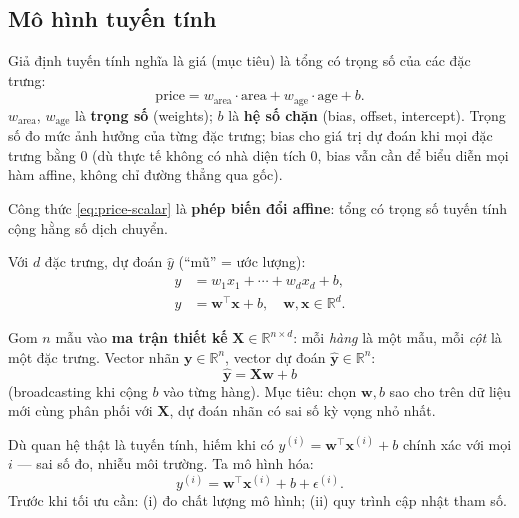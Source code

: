 \documentclass[12pt,a4paper]{article}
\begin{document}
\subsection{Mô hình tuyến tính}

\begin{dinhnghia}[title={Mô hình affine / tuyến tính}]
Giả định tuyến tính nghĩa là giá (mục tiêu) là tổng có trọng số của các đặc trưng:
\begin{equation}\label{eq:price-scalar}
  \mathrm{price} = w_{\mathrm{area}} \cdot \mathrm{area} + w_{\mathrm{age}} \cdot \mathrm{age} + b.
\end{equation}
$w_{\mathrm{area}}$, $w_{\mathrm{age}}$ là \textbf{trọng số} (weights); $b$ là \textbf{hệ số chặn} (bias, offset, intercept). Trọng số đo mức ảnh hưởng của từng đặc trưng; bias cho giá trị dự đoán khi mọi đặc trưng bằng 0 (dù thực tế không có nhà diện tích 0, bias vẫn cần để biểu diễn mọi hàm affine, không chỉ đường thẳng qua gốc).

Công thức \eqref{eq:price-scalar} là \textbf{phép biến đổi affine}: tổng có trọng số tuyến tính cộng hằng số dịch chuyển.
\end{dinhnghia}

Với $d$ đặc trưng, dự đoán $\hat{y}$ (``mũ'' = ước lượng):
\begin{align}
  \hat{y} &= w_1 x_1 + \cdots + w_d x_d + b, \label{eq:scalar}\\
  \hat{y} &= \mathbf{w}^\top \mathbf{x} + b, \quad \mathbf{w}, \mathbf{x} \in \mathbb{R}^d. \label{eq:dot}
\end{align}

\begin{dinhnghia}[title={Ma trận thiết kế}]
Gom $n$ mẫu vào \textbf{ma trận thiết kế} $\mathbf{X} \in \mathbb{R}^{n \times d}$: mỗi \emph{hàng} là một mẫu, mỗi \emph{cột} là một đặc trưng. Vector nhãn $\mathbf{y} \in \mathbb{R}^n$, vector dự đoán $\hat{\mathbf{y}} \in \mathbb{R}^n$:
\begin{equation}\label{eq:matrix}
  \hat{\mathbf{y}} = \mathbf{X}\mathbf{w} + b
\end{equation}
(broadcasting khi cộng $b$ vào từng hàng). Mục tiêu: chọn $\mathbf{w}, b$ sao cho trên dữ liệu mới cùng phân phối với $\mathbf{X}$, dự đoán nhãn có sai số kỳ vọng nhỏ nhất.
\end{dinhnghia}

\begin{luuy}[title={Nhiễu đo lường}]
Dù quan hệ thật là tuyến tính, hiếm khi có $y^{(i)} = \mathbf{w}^\top \mathbf{x}^{(i)} + b$ chính xác với mọi $i$ --- sai số đo, nhiễu môi trường. Ta mô hình hóa:
\[
  y^{(i)} = \mathbf{w}^\top \mathbf{x}^{(i)} + b + \epsilon^{(i)}.
\]
Trước khi tối ưu cần: (i) đo chất lượng mô hình; (ii) quy trình cập nhật tham số.
\end{luuy}
\end{document}
